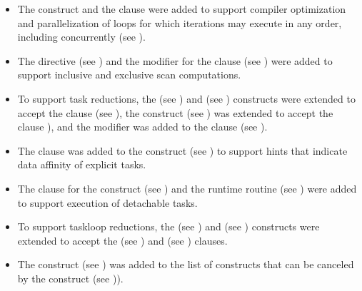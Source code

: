 \begin{itemize}
\item The  construct and the  clause were 
      added to support compiler optimization and parallelization of loops for 
      which iterations may execute in any order, including concurrently 
      (see ).

\item The  directive (see ) and the
       modifier for the  clause (see
      ) were added to support
      inclusive and exclusive scan computations.

\item To support task reductions, the  (see
      ) and  (see
      ) constructs were extended to
      accept the  clause (see
      ), the 
      construct (see ) was extended
      to accept the  clause
      ), and the 
      modifier was added to the  clause (see
      ).

\item The  clause was added to the  construct
      (see ) to support hints that indicate 
      data affinity of explicit tasks.

\item The  clause for the  construct (see 
      ) and the 
      runtime routine (see ) were added 
      to support execution of detachable tasks.

\item To support taskloop reductions, the  (see
      ) and  (see
      ) constructs were extended
      to accept the  (see )
      and  (see )
      clauses.

\item The  construct (see )
      was added to the list of constructs that can be canceled by the
       construct (see )).


\end{itemize}
